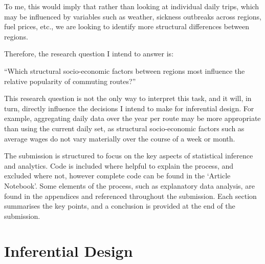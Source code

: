 \documentclass[
  number]{elsarticle}
\begin{document}
To me, this would imply that rather than looking at individual daily
trips, which may be influenced by variables such as weather, sickness
outbreaks across regions, fuel prices, etc., we are looking to identify
more structural differences between regions.

Therefore, the research question I intend to answer is:

``Which structural socio-economic factors between regions most influence
the relative popularity of commuting routes?''

This research question is not the only way to interpret this task, and
it will, in turn, directly influence the decisions I intend to make for
inferential design. For example, aggregating daily data over the year
per route may be more appropriate than using the current daily set, as
structural socio-economic factors such as average wages do not vary
materially over the course of a week or month.

The submission is structured to focus on the key aspects of statistical
inference and analytics. Code is included where helpful to explain the
process, and excluded where not, however complete code can be found in
the `Article Notebook'. Some elements of the process, such as
explanatory data analysis, are found in the appendices and referenced
throughout the submission. Each section summarises the key points, and a
conclusion is provided at the end of the submission.

\section{Inferential Design}\label{sec-inferential-design}
\end{document}
